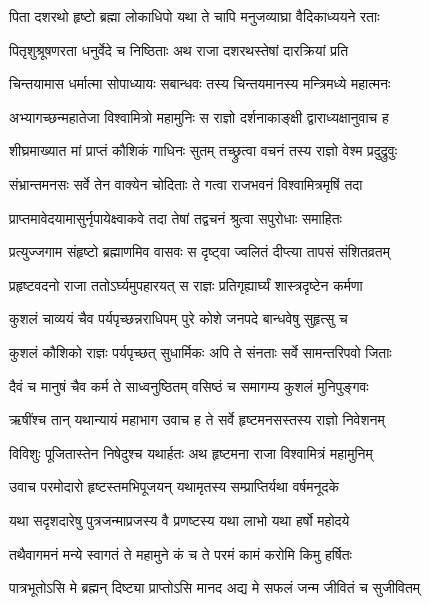 \twolineshloka
{पिता दशरथो हृष्टो ब्रह्मा लोकाधिपो यथा}
{ते चापि मनुजव्याघ्रा वैदिकाध्ययने रताः} %

\twolineshloka
{पितृशुश्रूषणरता धनुर्वेदे च निष्ठिताः}
{अथ राजा दशरथस्तेषां दारक्रियां प्रति} %

\twolineshloka
{चिन्तयामास धर्मात्मा सोपाध्यायः सबान्धवः}
{तस्य चिन्तयमानस्य मन्त्रिमध्ये महात्मनः} %

\twolineshloka
{अभ्यागच्छन्महातेजा विश्वामित्रो महामुनिः}
{स राज्ञो दर्शनाकाङ्क्षी द्वाराध्यक्षानुवाच ह} %

\twolineshloka
{शीघ्रमाख्यात मां प्राप्तं कौशिकं गाधिनः सुतम्}
{तच्छ्रुत्वा वचनं तस्य राज्ञो वेश्म प्रदुद्रुवुः} %

\twolineshloka
{संभ्रान्तमनसः सर्वे तेन वाक्येन चोदिताः}
{ते गत्वा राजभवनं विश्वामित्रमृषिं तदा} %

\twolineshloka
{प्राप्तमावेदयामासुर्नृपायेक्ष्वाकवे तदा}
{तेषां तद्वचनं श्रुत्वा सपुरोधाः समाहितः} %

\twolineshloka
{प्रत्युज्जगाम संहृष्टो ब्रह्माणमिव वासवः}
{स दृष्ट्वा ज्वलितं दीप्त्या तापसं संशितव्रतम्} %

\twolineshloka
{प्रहृष्टवदनो राजा ततोऽर्घ्यमुपहारयत्}
{स राज्ञः प्रतिगृह्यार्घ्यं शास्त्रदृष्टेन कर्मणा} %

\twolineshloka
{कुशलं चाव्ययं चैव पर्यपृच्छन्नराधिपम्}
{पुरे कोशे जनपदे बान्धवेषु सुहृत्सु च} %

\twolineshloka
{कुशलं कौशिको राज्ञः पर्यपृच्छत् सुधार्मिकः}
{अपि ते संनताः सर्वे सामन्तरिपवो जिताः} %

\twolineshloka
{दैवं च मानुषं चैव कर्म ते साध्वनुष्ठितम्}
{वसिष्ठं च समागम्य कुशलं मुनिपुङ्गवः} %

\twolineshloka
{ऋषींश्च तान् यथान्यायं महाभाग उवाच ह}
{ते सर्वे हृष्टमनसस्तस्य राज्ञो निवेशनम्} %

\twolineshloka
{विविशुः पूजितास्तेन निषेदुश्च यथार्हतः}
{अथ हृष्टमना राजा विश्वामित्रं महामुनिम्} %

\twolineshloka
{उवाच परमोदारो हृष्टस्तमभिपूजयन्}
{यथामृतस्य सम्प्राप्तिर्यथा वर्षमनूदके} %

\twolineshloka
{यथा सदृशदारेषु पुत्रजन्माप्रजस्य वै}
{प्रणष्टस्य यथा लाभो यथा हर्षो महोदये} %

\twolineshloka
{तथैवागमनं मन्ये स्वागतं ते महामुने}
{कं च ते परमं कामं करोमि किमु हर्षितः} %

\twolineshloka
{पात्रभूतोऽसि मे ब्रह्मन् दिष्ट्या प्राप्तोऽसि मानद}
{अद्य मे सफलं जन्म जीवितं च सुजीवितम्} %

